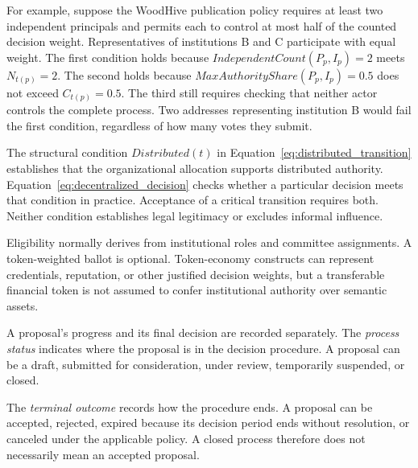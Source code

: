 \documentclass[journal]{IEEEtran}
\begin{document}
For example, suppose the WoodHive publication policy requires
at least two independent principals and permits each to
control at most half of the counted decision weight.
Representatives of institutions B and C participate with
equal weight. The first condition holds because
$IndependentCount(P_p,I_p)=2$ meets $N_{t(p)}=2$.
The second holds because
$MaxAuthorityShare(P_p,I_p)=0.5$ does not exceed
$C_{t(p)}=0.5$. The third still requires checking that
neither actor controls the complete process.
Two addresses representing institution B would fail the
first condition, regardless of how many votes they submit.


The structural condition $Distributed(t)$ in
Equation~\ref{eq:distributed_transition} establishes that the
organizational allocation supports distributed authority.
Equation~\ref{eq:decentralized_decision} checks whether a
particular decision meets that condition in practice.
Acceptance of a critical transition requires both.
Neither condition establishes legal legitimacy or excludes
informal influence.

Eligibility normally derives from institutional roles and
committee assignments. A token-weighted ballot is optional.
Token-economy constructs can represent credentials, reputation,
or other justified decision weights, but a transferable
financial token is not assumed to confer institutional
authority over semantic assets.

A proposal's progress and its final decision are recorded
separately. The \emph{process status} indicates where the
proposal is in the decision procedure. A proposal can be
a draft, submitted for consideration, under review,
temporarily suspended, or closed.

The \emph{terminal outcome} records how the procedure ends.
A proposal can be accepted, rejected, expired because its
decision period ends without resolution, or canceled
under the applicable policy. A closed process therefore
does not necessarily mean an accepted proposal.
\end{document}
